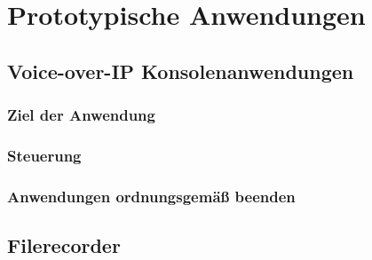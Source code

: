 \chapter{Prototypische Anwendungen}
\section{Voice-over-IP Konsolenanwendungen}
\subsection{Ziel der Anwendung}
\subsection{Steuerung}
\subsection{Anwendungen ordnungsgemäß beenden}
\section{Filerecorder}
